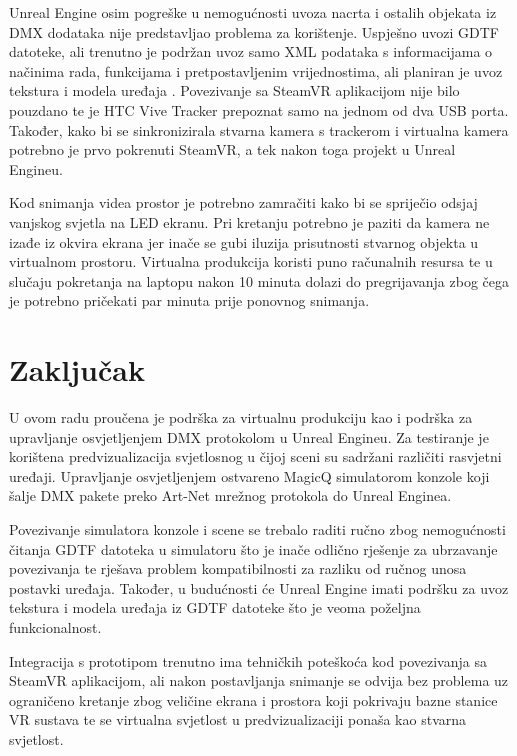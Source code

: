 \documentclass[times, utf8, zavrsni, numeric]{fer}
\begin{document}
Unreal Engine osim pogreške u nemogućnosti uvoza nacrta i ostalih objekata iz DMX dodataka nije predstavljao problema za korištenje. Uspješno uvozi GDTF datoteke, ali trenutno je podržan uvoz samo XML podataka s informacijama o načinima rada, funkcijama i pretpostavljenim vrijednostima, ali planiran je uvoz tekstura i modela uređaja \cite{dmx_gdtf}. Povezivanje sa SteamVR aplikacijom nije bilo pouzdano te je HTC Vive Tracker prepoznat samo na jednom od dva USB porta. Također, kako bi se sinkronizirala stvarna kamera s trackerom i virtualna kamera potrebno je prvo pokrenuti SteamVR, a tek nakon toga projekt u Unreal Engineu. \newline

Kod snimanja videa prostor je potrebno zamračiti kako bi se spriječio odsjaj vanjskog svjetla na LED ekranu. Pri kretanju potrebno je paziti da kamera ne izađe iz okvira ekrana jer inače se gubi iluzija prisutnosti stvarnog objekta u virtualnom prostoru. Virtualna produkcija koristi puno računalnih resursa te u slučaju pokretanja na laptopu nakon 10 minuta dolazi do pregrijavanja zbog čega je potrebno pričekati par minuta prije ponovnog snimanja.

\chapter{Zaključak}
U ovom radu proučena je podrška za virtualnu produkciju kao i podrška za upravljanje osvjetljenjem DMX protokolom u Unreal Engineu. Za testiranje je korištena predvizualizacija svjetlosnog u čijoj sceni su sadržani različiti rasvjetni uređaji. Upravljanje osvjetljenjem ostvareno MagicQ simulatorom konzole koji šalje DMX pakete preko Art-Net mrežnog protokola do Unreal Enginea. \newline

Povezivanje simulatora konzole i scene se trebalo raditi ručno zbog nemogućnosti čitanja GDTF datoteka u simulatoru što je inače odlično rješenje za ubrzavanje povezivanja te rješava problem kompatibilnosti za razliku od ručnog unosa postavki uređaja. Također, u budućnosti će Unreal Engine imati podršku za uvoz tekstura i modela uređaja iz GDTF datoteke što je veoma poželjna funkcionalnost. \newline

Integracija s prototipom trenutno ima tehničkih poteškoća kod povezivanja sa SteamVR aplikacijom, ali nakon postavljanja snimanje se odvija bez problema uz ograničeno kretanje zbog veličine ekrana i prostora koji pokrivaju bazne stanice VR sustava te se virtualna svjetlost u predvizualizaciji ponaša kao stvarna svjetlost.
\end{document}

